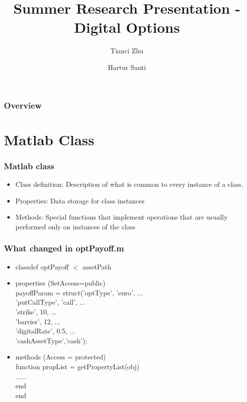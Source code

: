 \documentclass[10pt,Compress]{beamer}
\title[Options]{\huge{Summer Research Presentation - Digital Options}}
\author{Tianci Zhu \and Hartur Santi}
\institute[IIT]{Illinois Institute of Technology}
\begin{document}
\titlepage


\begin{frame}
\frametitle{Overview}
\tableofcontents
\end{frame}

\section{Matlab Class}
\begin{frame}
\frametitle{Matlab class}
\begin{itemize}
\item Class definition: Description of what is common to every instance of a class.
\item Properties: Data storage for class instances
\item Methods: Special functions that implement operations that are usually performed only on instances of the class
\end{itemize}
\end{frame}

\begin{frame}
\frametitle{What changed in optPayoff.m}
\begin{itemize}
\item classdef optPayoff $<$ assetPath
\item properties (SetAccess=public) \\
\hspace{0.5 cm} payoffParam = struct('optType', {{'euro'}}, ...\\
 \hspace{1.2cm}  'putCallType', {{'call'}}, ...\\ 
 \hspace{1.2cm}       'strike', 10, ... \\
 \hspace{1.2cm}        'barrier', 12, ... \\
 \hspace{1.2cm}      'digitalRate', 0.5, ...\\
 \hspace{1.2cm}     'cashAssetType',{{'cash'}}); 
 \item  methods (Access = protected)\\
 
      \hspace{0.5 cm}function propList = getPropertyList(obj)\\
     \hspace{0.5 cm} ......\\
         \hspace{0.5 cm}end\\
   end
 \end{itemize}
\end{frame}
\end{document}
